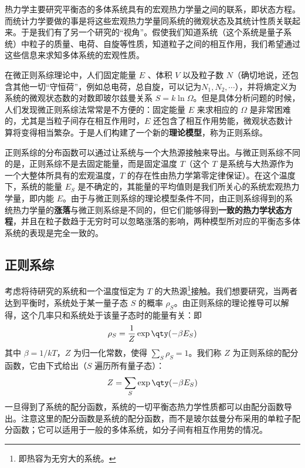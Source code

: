 
热力学主要研究平衡态的多体系统具有的宏观热力学量之间的联系，即状态方程。而统计力学要做的事是将这些宏观热力学量同系统的微观状态及其统计性质关联起来。于是我们有了另一个研究的“视角”。假使我们知道系统（这个系统是量子系统）中粒子的质量、电荷、自旋等性质，知道粒子之间的相互作用，我们希望通过这些信息来求知多体系统的宏观性质。

在微正则系综理论中，人们固定能量 $E$ 、体积 $V$ 以及粒子数 $N$（确切地说，还包含其他一切“守恒荷”，例如总电荷，总自旋，可以记为$N_1,N_2,\cdots$），并将熵定义为系统的微观状态数的对数即玻尔兹曼关系 $S=k\ln \Omega$。但是具体分析问题的时候，人们发现微正则系综法常常是不方便的：固定能量 $E$ 来求相应的 $\Omega$ 是非常困难的，尤其是当粒子间存在相互作用时，$E$ 还包含了相互作用势能，微观状态数计算将变得相当繁杂。于是人们构建了一个新的\textbf{理论模型}，称为正则系综。

正则系综的分布函数可以通过让系统与一个大热源接触来导出。与微正则系综不同的是，正则系综不是去固定能量，而是固定温度 $T$（这个 $T$ 是系统与大热源作为一个大整体所具有的宏观温度，$T$ 的存在性由热力学第零定律保证）。在这个温度下，系统的能量 $E_S$ 是不确定的，其能量的平均值则是我们所关心的系统宏观热力学量，即内能 $E$。由于与微正则系综的理论模型条件不同，由正则系综得到的系统热力学量的\textbf{涨落}与微正则系综是不同的，但它们能够得到\textbf{一致的热力学状态方程}，并且在粒子数趋于无穷时可以忽略涨落的影响，两种模型所对应的平衡态多体系统的表现是完全一致的。
\subsection{正则系综}
考虑将待研究的系统和一个温度恒定为 $T$ 的大热源\footnote{即热容为无穷大的系统。}接触。我们想要研究，当两者达到平衡时，系统处于某一量子态 $S$ 的概率 $\rho_S$。由正则系综的理论推导可以解得，这个几率只和系统处于该量子态时的能量有关：即
\begin{equation}\label{CEsb_eq1}
\rho_S=\frac{1}{Z}\exp\qty(-\beta E_S)
\end{equation}
其中 $\beta=1/kT$，$Z$ 为归一化常数，使得 $\sum_S \rho_S=1$。我们称 $Z$ 为正则系综的配分函数，它由下式给出（$S$ 遍历所有量子态）：
\begin{equation}
Z=\sum_S \exp\qty(-\beta E_S)
\end{equation}
一旦得到了系统的配分函数，系统的一切平衡态热力学性质都可以由配分函数导出。注意这里的配分函数是系统的配分函数，而不是玻尔兹曼分布采用的单粒子配分函数；它可以适用于一般的多体系统，如分子间有相互作用势的情况。

